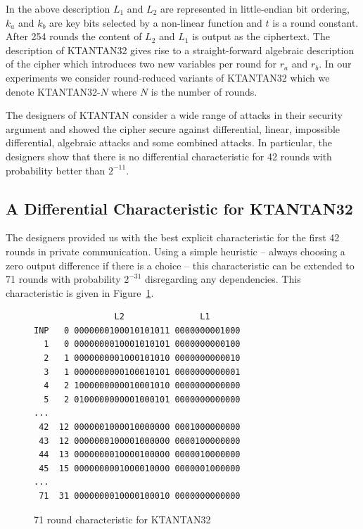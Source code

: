 In the above description $L_1$ and $L_2$ are represented in little-endian bit ordering, $k_a$ and $k_b$ are key bits selected by a non-linear function and $t$ is a round constant. After 254 rounds the content of $L_2$ and $L_1$ is output as the ciphertext. The description of KTANTAN32 gives rise to a straight-forward algebraic description of the cipher which introduces two new variables per round for $r_a$ and $r_b$. In our experiments we consider round-reduced variants of KTANTAN32 which we denote KTANTAN32-$N$ where $N$ is the number of rounds.

The designers of KTANTAN consider a wide range of attacks in their security argument and showed the cipher secure against differential, linear, impossible differential, algebraic attacks and some combined attacks. In particular, the designers show that there is no differential characteristic for 42 rounds with probability better than $2^{-11}$. 

\subsection{A Differential Characteristic for KTANTAN32}
\label{sec:ktantan32-characteristic}
The designers provided us with the best explicit characteristic for the first 42 rounds in private communication. Using a simple heuristic -- always choosing a zero output difference if there is a choice -- this characteristic can be extended to 71 rounds with probability $2^{-31}$ disregarding any dependencies. This characteristic is given in Figure~\ref{fig:ktantan32-characteristic}.

\begin{figure}[ht]
\begin{center}
\begin{minipage}{0.6\textwidth}
\begin{verbatim}
                L2               L1
INP   0 0000000100010101011 0000000001000
  1   0 0000000010001010101 0000000000100                                   
  2   1 0000000001000101010 0000000000010                                 
  3   1 0000000000100010101 0000000000001
  4   2 1000000000010001010 0000000000000
  5   2 0100000000001000101 0000000000000
...                                      
 42  12 0000001000010000000 0001000000000
 43  12 0000000100001000000 0000100000000
 44  13 0000000010000100000 0000010000000
 45  15 0000000001000010000 0000001000000
...                                      
 71  31 0000000010000100010 0000000000000
\end{verbatim}
\end{minipage}
\end{center}
\caption{71 round characteristic for KTANTAN32}
\label{fig:ktantan32-characteristic}
\end{figure}


